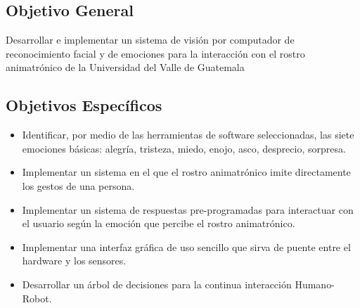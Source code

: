 \subsection*{Objetivo General}
Desarrollar e implementar un sistema de visión por computador de reconocimiento facial y de emociones para la interacción con el rostro animatrónico de la Universidad del Valle de Guatemala

\subsection*{Objetivos Específicos}
\begin{itemize}
\item Identificar, por medio de las herramientas de software seleccionadas, las siete emociones básicas: alegría, tristeza, miedo, enojo, asco, desprecio, sorpresa.
\item Implementar un sistema en el que el rostro animatrónico imite directamente los gestos de una persona.
\item Implementar un sistema de respuestas pre-programadas para interactuar con el usuario según la emoción que percibe el rostro animatrónico.
\item Implementar una interfaz gráfica de uso sencillo que sirva de puente entre el hardware y los sensores.
\item Desarrollar un árbol de decisiones para la continua interacción Humano-Robot.
\end{itemize}